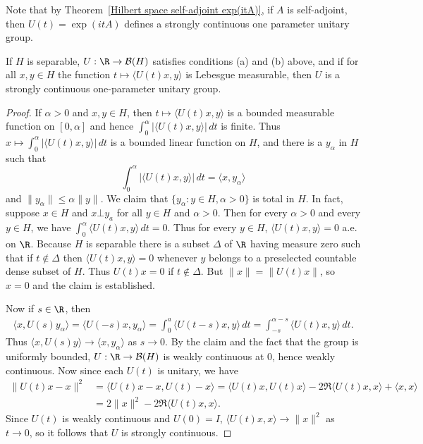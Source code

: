 Note that by Theorem~\ref{Hilbert space self-adjoint exp(itA)}, if $A$ is self-adjoint, then $U(t)=\exp(itA)$ defines a strongly continuous one parameter unitary group.
\begin{theorem}
If $H$ is separable, $U:\R\to\mathcal{B}(H)$ satisfies conditions (a) and (b) above, and if for all $x,y\in H$ the function $t\mapsto\langle U(t)x,y\rangle$ is Lebesgue measurable, then $U$ is a strongly continuous one-parameter unitary group.
\end{theorem}
\begin{proof}
If $\alpha>0$ and $x,y\in H$, then $t\mapsto\langle U(t)x,y\rangle$ is a bounded measurable function on $[0,\alpha]$ and hence $\int_0^\alpha|\langle U(t)x,y\rangle|\,dt$ is finite. Thus $x\mapsto\int_0^\alpha|\langle U(t)x,y\rangle|\,dt$ is a bounded linear function on $H$, and there is a $y_\alpha$ in $H$ such that
\[\int_0^\alpha|\langle U(t)x,y\rangle|\,dt=\langle x,y_\alpha\rangle\]
and $\|y_\alpha\|\leq\alpha\|y\|$. We claim that $\{y_\alpha:y\in H,\alpha>0\}$ is total in $H$. In fact, suppose $x\in H$ and $x\bot y_a$ for all $y\in H$ and $\alpha>0$. Then for every $\alpha>0$ and every $y\in H$, we have $\int_0^\alpha\langle U(t)x,y\rangle\,dt=0$. Thus for every $y\in H$, $\langle U(t)x,y\rangle=0$ a.e. on $\R$. Because $H$ is separable there is a subset $\Delta$ of $\R$ having measure zero such that if $t\notin\Delta$ then $\langle U(t)x,y\rangle=0$ whenever $y$ belongs to a preselected countable dense subset of $H$. Thus $U(t)x=0$ if $t\notin\Delta$. But $\|x\|=\|U(t)x\|$, so $x=0$ and the claim is established.\par
Now if $s\in\R$, then
\begin{align*}
\langle x,U(s)y_\alpha\rangle=\langle U(-s)x,y_\alpha\rangle=\int_0^a\langle U(t-s)x,y\rangle\,dt=\int_{-s}^{\alpha-s}\langle U(t)x,y\rangle\,dt.
\end{align*}
Thus $\langle x,U(s)y\rangle\to\langle x,y_\alpha\rangle$ as $s\to 0$. By the claim and the fact that the group is uniformly bounded, $U:\R\to\mathcal{B}(H)$ is weakly continuous at $0$, hence weakly continuous. Now since each $U(t)$ is unitary, we have
\begin{align*}
\|U(t)x-x\|^2&=\langle U(t)x-x,U(t)-x\rangle=\langle U(t)x,U(t)x\rangle-2\Re\langle U(t)x,x\rangle+\langle x,x\rangle\\
&=2\|x\|^2-2\Re\langle U(t)x,x\rangle.
\end{align*}
Since $U(t)$ is weakly continuous and $U(0)=I$, $\langle U(t)x,x\rangle\to\|x\|^2$ as $t\to 0$, so it follows that $U$ is strongly continuous.
\end{proof}
